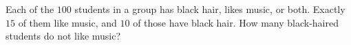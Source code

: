 Each of the $100$ students in a group has black hair, likes music, or both. Exactly $15$ of them like music, and $10$ of those have black hair. How many black-haired students do not like music?
